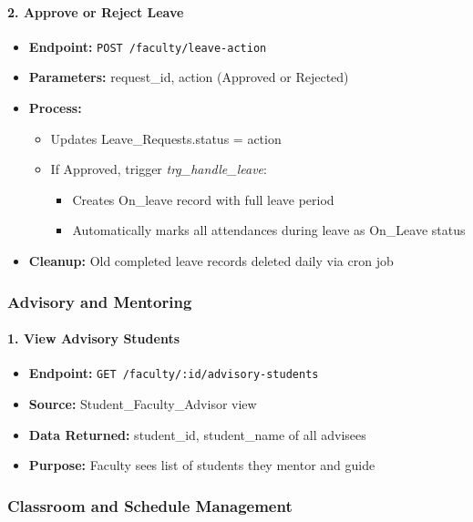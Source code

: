 \documentclass[12pt]{article}
\begin{document}
\paragraph{2. Approve or Reject Leave}
\begin{itemize}
    \item \textbf{Endpoint:} \texttt{POST /faculty/leave-action}
    \item \textbf{Parameters:} request\_id, action (Approved or Rejected)
    \item \textbf{Process:}
        \begin{itemize}
            \item Updates Leave\_Requests.status = action
            \item If Approved, trigger \textit{trg\_handle\_leave}:
                \begin{itemize}
                    \item Creates On\_leave record with full leave period
                    \item Automatically marks all attendances during leave as On\_Leave status
                \end{itemize}
        \end{itemize}
    \item \textbf{Cleanup:} Old completed leave records deleted daily via cron job
\end{itemize}

\subsubsection{Advisory and Mentoring}

\paragraph{1. View Advisory Students}
\begin{itemize}
    \item \textbf{Endpoint:} \texttt{GET /faculty/:id/advisory-students}
    \item \textbf{Source:} Student\_Faculty\_Advisor view
    \item \textbf{Data Returned:} student\_id, student\_name of all advisees
    \item \textbf{Purpose:} Faculty sees list of students they mentor and guide
\end{itemize}

\subsubsection{Classroom and Schedule Management}
\end{document}

